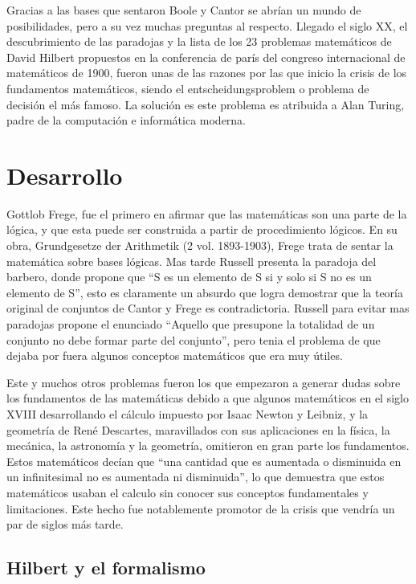 \documentclass[11pt]{article}
\begin{document}
Gracias a las bases que sentaron Boole y Cantor se abrían un mundo de posibilidades, pero a su vez muchas preguntas al respecto. Llegado el siglo XX, el descubrimiento de las paradojas y la lista de los 23 problemas matemáticos de David Hilbert propuestos en la conferencia de parís del congreso internacional de matemáticos de 1900, fueron unas de las razones por las que inicio la crisis de los fundamentos matemáticos, siendo el entscheidungsproblem o problema de decisión el más famoso. La solución es este problema es atribuida a Alan Turing, padre de la computación e informática moderna.

\citet{Wiki}
\section{Desarrollo}

Gottlob Frege, fue el primero en afirmar que las matemáticas son una parte de la lógica, y que esta puede ser construida a partir de procedimiento lógicos. En su obra, Grundgesetze der Arithmetik (2 vol. 1893-1903), Frege trata de sentar la matemática sobre bases lógicas. Mas tarde Russell presenta la paradoja del barbero, donde propone que “S es un elemento de S si y solo si S no es un elemento de S”, esto es claramente un absurdo que logra demostrar que la teoría original de conjuntos de Cantor y Frege es contradictoria. Russell para evitar mas paradojas propone el enunciado “Aquello que presupone la totalidad de un conjunto no debe formar parte del conjunto”, pero tenia el problema de que dejaba por fuera algunos conceptos matemáticos que era muy útiles.

Este y muchos otros problemas fueron los que empezaron a generar dudas sobre los fundamentos de las matemáticas debido a que algunos matemáticos en el siglo XVIII desarrollando el cálculo impuesto por Isaac Newton y Leibniz, y la geometría de René Descartes, maravillados con sus aplicaciones en la física, la mecánica, la astronomía y la geometría, omitieron en gran parte los fundamentos. Estos matemáticos decían que “una cantidad que es aumentada o disminuida en un infinitesimal no es aumentada ni disminuida”, lo que demuestra que estos matemáticos usaban el calculo sin conocer sus conceptos fundamentales y limitaciones. Este hecho fue notablemente promotor de la crisis que vendría un par de siglos más tarde.

\citet{mario}

\subsection{Hilbert y el formalismo}
\end{document}
